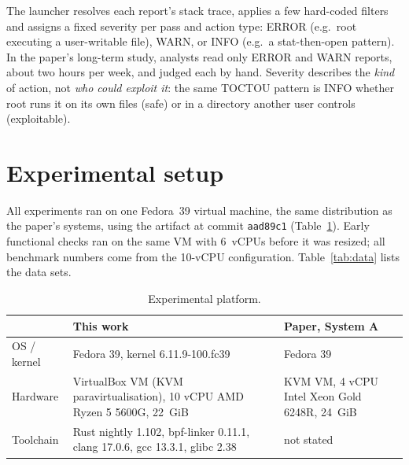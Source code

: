\documentclass[11pt,a4paper]{article}
\begin{document}
The launcher resolves each report's stack trace, applies a few hard-coded filters and assigns a
fixed severity per pass and action type: ERROR (e.g.\ root executing a user-writable file), WARN, or
INFO (e.g.\ a stat-then-open pattern). In the paper's long-term study, analysts read only ERROR and
WARN reports, about two hours per week, and judged each by hand. Severity describes the \emph{kind}
of action, not \emph{who could exploit it}: the same TOCTOU pattern is INFO whether root runs it on
its own files (safe) or in a directory another user controls (exploitable).

\section{Experimental setup}

All experiments ran on one Fedora~39 virtual machine, the same distribution as the paper's
systems, using the artifact at commit \texttt{aad89c1} (Table~\ref{tab:setup}). Early functional
checks ran on the same VM with 6~vCPUs before it was resized; all benchmark numbers come from the
10-vCPU configuration. Table~\ref{tab:data} lists the data sets.

\begin{table}[H]
\centering\small
\caption{Experimental platform.}
\label{tab:setup}
\begin{tabularx}{\linewidth}{@{}l X X@{}}
\toprule
& This work & Paper, System A~\cite{ossan} \\
\midrule
OS / kernel & Fedora 39, kernel 6.11.9-100.fc39 & Fedora 39 \\
Hardware & VirtualBox VM (KVM paravirtualisation), 10 vCPU AMD Ryzen 5 5600G, 22~GiB & KVM VM, 4 vCPU Intel Xeon Gold 6248R, 24~GiB \\
Toolchain & Rust nightly 1.102, bpf-linker 0.11.1, clang 17.0.6, gcc 13.3.1, glibc 2.38 & not stated \\
\bottomrule
\end{tabularx}
\end{table}
\end{document}
